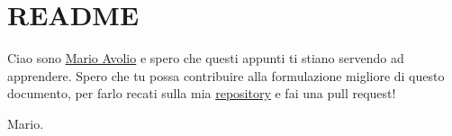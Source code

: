 \chapter*{README}
\label{README}

\begin{dedication}
Ciao sono \href{https://github.com/MarioAvolio}{Mario Avolio} e spero che questi appunti ti stiano servendo ad apprendere. Spero che tu possa contribuire alla formulazione migliore di questo documento, per farlo recati sulla mia \href{https://github.com/MarioAvolio/Unimib-Computer-Science-Notes}{repository} e fai una pull request!

\vspace{\baselineskip}
Mario.
\end{dedication}
